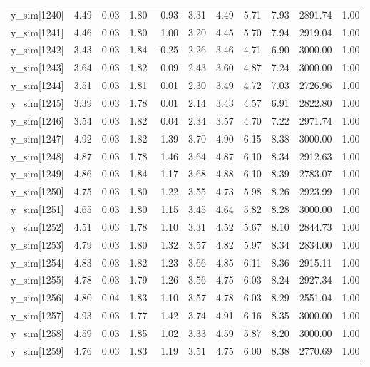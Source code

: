 \begin{table}[ht]
\begin{tabular}{rrrrrrrrrrr}
  y\_sim[1240] & 4.49 & 0.03 & 1.80 & 0.93 & 3.31 & 4.49 & 5.71 & 7.93 & 2891.74 & 1.00 \\ 
  y\_sim[1241] & 4.46 & 0.03 & 1.80 & 1.00 & 3.20 & 4.45 & 5.70 & 7.94 & 2919.04 & 1.00 \\ 
  y\_sim[1242] & 3.43 & 0.03 & 1.84 & -0.25 & 2.26 & 3.46 & 4.71 & 6.90 & 3000.00 & 1.00 \\ 
  y\_sim[1243] & 3.64 & 0.03 & 1.82 & 0.09 & 2.43 & 3.60 & 4.87 & 7.24 & 3000.00 & 1.00 \\ 
  y\_sim[1244] & 3.51 & 0.03 & 1.81 & 0.01 & 2.30 & 3.49 & 4.72 & 7.03 & 2726.96 & 1.00 \\ 
  y\_sim[1245] & 3.39 & 0.03 & 1.78 & 0.01 & 2.14 & 3.43 & 4.57 & 6.91 & 2822.80 & 1.00 \\ 
  y\_sim[1246] & 3.54 & 0.03 & 1.82 & 0.04 & 2.34 & 3.57 & 4.70 & 7.22 & 2971.74 & 1.00 \\ 
  y\_sim[1247] & 4.92 & 0.03 & 1.82 & 1.39 & 3.70 & 4.90 & 6.15 & 8.38 & 3000.00 & 1.00 \\ 
  y\_sim[1248] & 4.87 & 0.03 & 1.78 & 1.46 & 3.64 & 4.87 & 6.10 & 8.34 & 2912.63 & 1.00 \\ 
  y\_sim[1249] & 4.86 & 0.03 & 1.84 & 1.17 & 3.68 & 4.88 & 6.10 & 8.39 & 2783.07 & 1.00 \\ 
  y\_sim[1250] & 4.75 & 0.03 & 1.80 & 1.22 & 3.55 & 4.73 & 5.98 & 8.26 & 2923.99 & 1.00 \\ 
  y\_sim[1251] & 4.65 & 0.03 & 1.80 & 1.15 & 3.45 & 4.64 & 5.82 & 8.28 & 3000.00 & 1.00 \\ 
  y\_sim[1252] & 4.51 & 0.03 & 1.78 & 1.10 & 3.31 & 4.52 & 5.67 & 8.10 & 2844.73 & 1.00 \\ 
  y\_sim[1253] & 4.79 & 0.03 & 1.80 & 1.32 & 3.57 & 4.82 & 5.97 & 8.34 & 2834.00 & 1.00 \\ 
  y\_sim[1254] & 4.83 & 0.03 & 1.82 & 1.23 & 3.66 & 4.85 & 6.11 & 8.36 & 2915.11 & 1.00 \\ 
  y\_sim[1255] & 4.78 & 0.03 & 1.79 & 1.26 & 3.56 & 4.75 & 6.03 & 8.24 & 2927.34 & 1.00 \\ 
  y\_sim[1256] & 4.80 & 0.04 & 1.83 & 1.10 & 3.57 & 4.78 & 6.03 & 8.29 & 2551.04 & 1.00 \\ 
  y\_sim[1257] & 4.93 & 0.03 & 1.77 & 1.42 & 3.74 & 4.91 & 6.16 & 8.35 & 3000.00 & 1.00 \\ 
  y\_sim[1258] & 4.59 & 0.03 & 1.85 & 1.02 & 3.33 & 4.59 & 5.87 & 8.20 & 3000.00 & 1.00 \\ 
  y\_sim[1259] & 4.76 & 0.03 & 1.83 & 1.19 & 3.51 & 4.75 & 6.00 & 8.38 & 2770.69 & 1.00 \\ 

\end{tabular}
\end{table}
